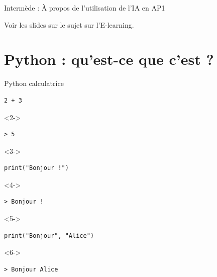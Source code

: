 \documentclass{beamer}
\begin{document}
\begin{frame}{Intermède : À propos de l'utilisation de l'IA en AP1}

  Voir les slides sur le sujet sur l'E-learning.

\end{frame}

\section{Python : qu'est-ce que c'est ?}




\begin{frame}[fragile]{Python \og calculatrice \fg{}}
	\begin{lstlisting}[style=python]
		2 + 3
	\end{lstlisting}
	\begin{onslide}<2->
		\begin{lstlisting}[style=pythonoutput]
			> 5
		\end{lstlisting}
	\end{onslide}
	\begin{onslide}<3->
		\begin{lstlisting}[style=python]
			print("Bonjour !")
		\end{lstlisting}
	\end{onslide}
	\begin{onslide}<4->
		\begin{lstlisting}[style=pythonoutput]
			> Bonjour !
		\end{lstlisting}
	\end{onslide}
	\begin{onslide}<5->
		\begin{lstlisting}[style=python]
			print("Bonjour", "Alice")
		\end{lstlisting}
	\end{onslide}
	\begin{onslide}<6->
		\begin{lstlisting}[style=pythonoutput]
			> Bonjour Alice
		\end{lstlisting}
	\end{onslide}
  \end{frame}
\end{document}
